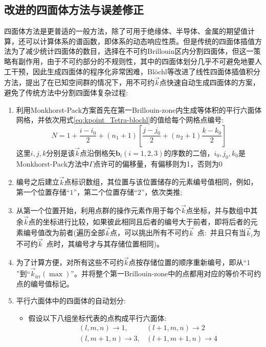 \subsection{改进的四面体方法与误差修正}\label{New_Tetrahedron}
四面体方法是更普适的一般方法，除了可用于绝缘体、半导体、金属的期望值计算，还可以计算体系的谱函数，即体系的动态响应性质。但是传统的四面体插值方法为了减少统计四面体的数目，选择在不可约\textrm{Brillouin}区内分割四面体，但这一策略有副作用，由于不可约部分的不规则性，其中的四面体划分几乎不可避免地要人工干预，因此生成四面体的程序化非常困难，\textrm{Bl\"ochl}等改进了线性四面体插值积分方法\cite{PRB49-16223_1994}，提出了在已知空间群的情况下，用不可约$\vec k$点快速自动生成四面体的方案，避免了传统方法中分割四面体复杂过程:~
\begin{enumerate}
	\item 利用\textrm{Monkhorst-Pack}方案\cite{PRB13-5188_1976}首先在第一\textrm{Brillouin-zone}内生成等体积的平行六面体网格，并依次用式\eqref{eq:kpoint_Tetra-blochl}的值给每个网格点编号:
\begin{equation}
	N=1+\dfrac{i-i_0}2+(n_1+1)\left[\dfrac{j-j_0}2+(n_2+1)\dfrac{k-k_0}2\right]
	\label{eq:kpoint_Tetra-blochl}
\end{equation}
这里$i,j,k$分别是该$\vec k$点沿倒格矢$\mathbf{b}_i(i=1,2,3)$的序数的二倍，$i_0,j_0,k_0$是\textrm{Monkhorst-Pack}方法中$\Gamma$点许可的偏移量，有偏移则为1，否则为0
	\item 编号之后建立$\vec k$点标识数组，其位置与该位置储存的元素编号值相同，例如，第一个位置存储“$1$”，第二个位置存储“$2$”，依次类推;~
	\item 从第一个位置开始，利用点群的操作元素作用于每个$\vec k$点坐标，并与数组中其余$\vec k$点的坐标进行比较，如果彼此相同且后者的编号大于前者，即将后者的元素编号值改为前者(遍历全部$\vec k$点，可以挑出所有不可约$\vec k$~点:~并且只有当$\vec k_i$为不可约$\vec k$~点时，其编号才与其存储位置相同)。
	\item 为了计算方便，对所有这些不可约$\vec k$点按存储位置的顺序重新编号，即从“$1$”到“$\vec k_{\mathrm{irr}}(\max)$”。并将整个第一\textrm{Brillouin-zone}中的点都用对应的等价不可约点的编号值标记。
	\item 平行六面体中的四面体的自动划分:~
		\begin{itemize}
			\item 假设以下八组坐标代表的点构成平行六面体:
\begin{displaymath}
	\begin{aligned}
		&(l,m,n)\rightarrow 1,&(l+1,m,n)\rightarrow 2\\
		&(l,m+1,n)\rightarrow 3,&(l+1,m+1,n)\rightarrow 4\\

\end{aligned}
\end{displaymath}
\end{itemize}
\end{enumerate}

